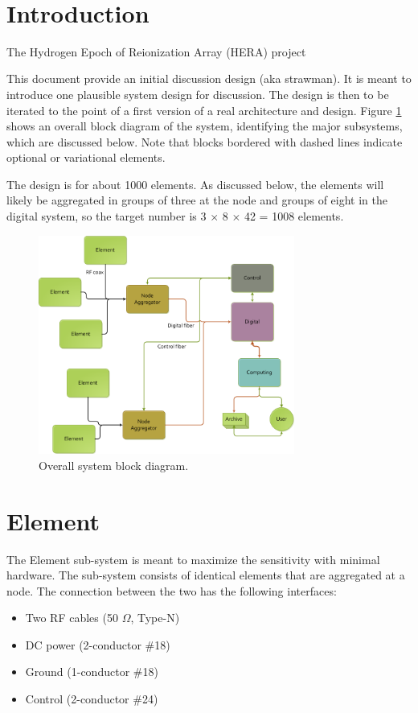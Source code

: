 \documentclass[11pt]{article}
\begin{document}
{ \\}
{
}
\vspace*{0.5cm}


\section{Introduction}
The Hydrogen Epoch of Reionization Array (HERA) project 

This document provide an initial discussion design (aka strawman).  It is meant to introduce one plausible system design for discussion.  The design is then to be iterated to the point of a first version of a real architecture and design.  Figure \ref{fig:overall} shows an overall block diagram of the system, identifying the major subsystems, which are discussed below.  Note that blocks bordered with dashed lines indicate optional or variational elements.

The design is for about 1000 elements.  As discussed below, the elements will likely be aggregated in groups of three at the node and groups of eight in the digital system, so the target number is 3 $\times$ 8 $\times$ 42 = 1008 elements.

\begin{figure}[h]
\centering
\includegraphics[width=0.75\textwidth]{plots/Overall.png}
\caption{Overall system block diagram.}
\label{fig:overall}
\end{figure}

\section{Element}
The Element sub-system is meant to maximize the sensitivity with minimal hardware.  The sub-system consists of identical elements that are aggregated at a node.  The connection between the two has the following interfaces:
\begin{itemize}
\item Two RF cables (50 $\Omega$, Type-N)
\item DC power (2-conductor \#18)
\item Ground (1-conductor \#18)
\item Control (2-conductor \#24)
\end{itemize}
\end{document}

